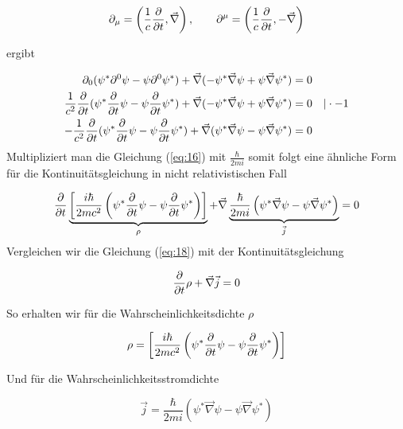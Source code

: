 \begin{equation}
  \label{eq:17}
  \partial_\mu = \left(\frac{1}{c}\pdiff_t,\vec \nabla\right), \qquad  \partial^\mu = \left(\frac{1}{c}\pdiff_t,-\vec \nabla\right)
\end{equation}

ergibt

\begin{align}
  \label{eq:16}
   \partial_0(  \psi^* \partial^0  \psi  - \psi \partial^0\psi^* ) + \vec \nabla ( - \psi^* \vec \nabla  \psi  + \psi \vec \nabla \psi^* )  &= 0 \\
 \frac{1}{c^2}\pdiff_t (  \psi^* \pdiff_t \psi  - \psi \pdiff_t\psi^* ) + \vec \nabla ( - \psi^* \vec \nabla  \psi  + \psi \vec \nabla \psi^* )  &= 0 \quad |\cdot -1 \\
- \frac{1}{c^2}\pdiff_t (  \psi^* \pdiff_t \psi  - \psi \pdiff_t\psi^* ) + \vec \nabla ( \psi^* \vec \nabla  \psi  - \psi \vec \nabla \psi^* )  &= 0 \\
\end{align}
Multipliziert man die Gleichung (\ref{eq:16}) mit \(\frac{\hbar}{2mi}\) somit folgt eine ähnliche Form für die Kontinuitätsgleichung in nicht relativistischen Fall

\begin{equation}
  \label{eq:18}
  \pdiff_t \underbr{ \left[ \frac{i\hbar}{2mc^2}\left( \psi^* \pdiff_t \psi  -  \psi \pdiff_t\psi^*\right) \right]}_{\rho} + \vec \nabla \underbr{\frac{\hbar}{2mi} \left( \psi^* \vec \nabla  \psi  - \psi \vec \nabla \psi^* \right)}_{\vec j}  = 0 \\
\end{equation}
Vergleichen wir die Gleichung (\ref{eq:18}) mit der Kontinuitätsgleichung 

\begin{equation}
  \label{eq:19}
  \pdiff_t \rho + \vec\nabla\vec j = 0
\end{equation}


So erhalten wir für die Wahrscheinlichkeitsdichte \(\rho\)

\begin{equation}
  \label{eq:20}
  \rho = \left[ \frac{i\hbar}{2mc^2}\left( \psi^* \pdiff_t \psi  -  \psi \pdiff_t\psi^*\right) \right]
\end{equation}

Und für die Wahrscheinlichkeitsstromdichte

\begin{equation}
  \label{eq:21}
  \vec j = \frac{\hbar}{2mi} \left( \psi^* \vec \nabla  \psi  - \psi \vec \nabla \psi^* \right)
\end{equation}


